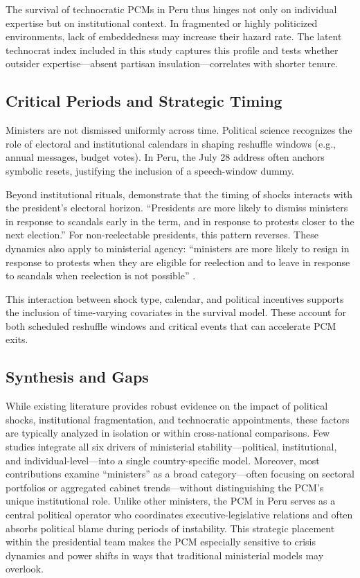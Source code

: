 \documentclass[a4paper, 12pt]{article}
\begin{document}
The survival of technocratic PCMs in Peru thus hinges not only on individual expertise but on institutional context. In fragmented or highly politicized environments, lack of embeddedness may increase their hazard rate. The latent technocrat index included in this study captures this profile and tests whether outsider expertise—absent partisan insulation—correlates with shorter tenure.


\subsection{Critical Periods and Strategic Timing}

Ministers are not dismissed uniformly across time. Political science recognizes the role of electoral and institutional calendars in shaping reshuffle windows (e.g., annual messages, budget votes). In Peru, the July 28 address often anchors symbolic resets, justifying the inclusion of a speech-window dummy.

Beyond institutional rituals, \citet[611]{camerlo_minister_2015-1} demonstrate that the timing of shocks interacts with the president’s electoral horizon. ``Presidents are more likely to dismiss ministers in response to scandals early in the term, and in response to protests closer to the next election.'' For non-reelectable presidents, this pattern reverses. These dynamics also apply to ministerial agency: ``ministers are more likely to resign in response to protests when they are eligible for reelection and to leave in response to scandals when reelection is not possible'' \citep[611]{camerlo_minister_2015-1}.

This interaction between shock type, calendar, and political incentives supports the inclusion of time-varying covariates in the survival model. These account for both scheduled reshuffle windows and critical events that can accelerate PCM exits.


\subsection{Synthesis and Gaps}

While existing literature provides robust evidence on the impact of political shocks, institutional fragmentation, and technocratic appointments, these factors are typically analyzed in isolation or within cross-national comparisons. Few studies integrate all six drivers of ministerial stability—political, institutional, and individual-level—into a single country-specific model. Moreover, most contributions examine ``ministers'' as a broad category—often focusing on sectoral portfolios or aggregated cabinet trends—without distinguishing the PCM's unique institutional role. Unlike other ministers, the PCM in Peru serves as a central political operator who coordinates executive-legislative relations and often absorbs political blame during periods of instability. This strategic placement within the presidential team makes the PCM especially sensitive to crisis dynamics and power shifts in ways that traditional ministerial models may overlook.
\end{document}
